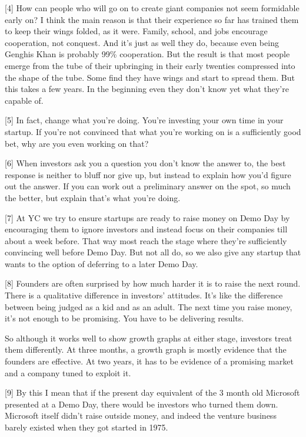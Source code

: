 {[}4{]} How can people who will go on to create giant companies not seem
formidable early on? I think the main reason is that their experience so
far has trained them to keep their wings folded, as it were. Family,
school, and jobs encourage cooperation, not conquest. And it's just as
well they do, because even being Genghis Khan is probably 99\%
cooperation. But the result is that most people emerge from the tube of
their upbringing in their early twenties compressed into the shape of
the tube. Some find they have wings and start to spread them. But this
takes a few years. In the beginning even they don't know yet what
they're capable of.

{[}5{]} In fact, change what you're doing. You're investing your own
time in your startup. If you're not convinced that what you're working
on is a sufficiently good bet, why are you even working on that?

{[}6{]} When investors ask you a question you don't know the answer to,
the best response is neither to bluff nor give up, but instead to
explain how you'd figure out the answer. If you can work out a
preliminary answer on the spot, so much the better, but explain that's
what you're doing.

{[}7{]} At YC we try to ensure startups are ready to raise money on Demo
Day by encouraging them to ignore investors and instead focus on their
companies till about a week before. That way most reach the stage where
they're sufficiently convincing well before Demo Day. But not all do, so
we also give any startup that wants to the option of deferring to a
later Demo Day.

{[}8{]} Founders are often surprised by how much harder it is to raise
the next round. There is a qualitative difference in investors'
attitudes. It's like the difference between being judged as a kid and as
an adult. The next time you raise money, it's not enough to be
promising. You have to be delivering results.

So although it works well to show growth graphs at either stage,
investors treat them differently. At three months, a growth graph is
mostly evidence that the founders are effective. At two years, it has to
be evidence of a promising market and a company tuned to exploit it.

{[}9{]} By this I mean that if the present day equivalent of the 3 month
old Microsoft presented at a Demo Day, there would be investors who
turned them down. Microsoft itself didn't raise outside money, and
indeed the venture business barely existed when they got started in
1975.

